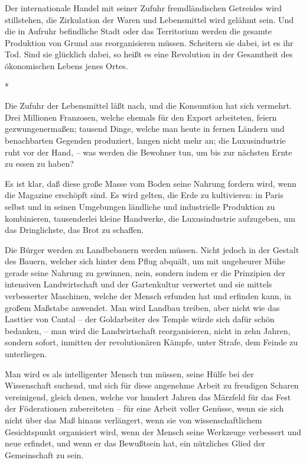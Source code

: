 \documentclass{scrbook}
\begin{document}
Der internationale Handel mit seiner Zufuhr fremdländischen Getreides wird stillstehen, die Zirkulation der Waren und Lebensmittel wird gelähmt sein. Und die in Aufruhr befindliche Stadt oder das Territorium werden die gesamte Produktion von Grund aus reorganisieren müssen. Scheitern sie dabei, ist es ihr Tod. Sind sie glücklich dabei, so heißt es eine Revolution in der Gesamtheit des ökonomischen Lebens jenes Ortes.

\begin{center}*\end{center}

Die Zufuhr der Lebensmittel läßt nach, und die Konsumtion hat sich vermehrt. Drei Millionen Franzosen, welche ehemals für den Export arbeiteten, feiern gezwungenermaßen; tausend Dinge, welche man heute in fernen Ländern und benachbarten Gegenden produziert, langen nicht mehr an; die Luxusindustrie ruht vor der Hand, – was werden die Bewohner tun, um bis zur nächsten Ernte zu essen zu haben?

Es ist klar, daß diese große Masse vom Boden seine Nahrung fordern wird, wenn die Magazine erschöpft sind. Es wird gelten, die Erde zu kultivieren: in Paris selbst und in seinen Umgebungen ländliche und industrielle Produktion zu kombinieren, tausenderlei kleine Handwerke, die Luxusindustrie aufzugeben, um das Dringlichste, das Brot zu schaffen.

Die Bürger werden zu Landbebauern werden müssen. Nicht jedoch in der Gestalt des Bauern, welcher sich hinter dem Pflug abquält, um mit ungeheurer Mühe gerade seine Nahrung zu gewinnen, nein, sondern indem er die Prinzipien der intensiven Landwirtschaft und der Gartenkultur verwertet und sie mittels verbesserter Maschinen, welche der Mensch erfunden hat und erfinden kann, in großem Maßstabe anwendet. Man wird Landbau treiben, aber nicht wie das Lasttier von Cantal – der Goldarbeiter des Temple würde sich dafür schön bedanken, – man wird die Landwirtschaft reorganisieren, nicht in zehn Jahren, sondern sofort, inmitten der revolutionären Kämpfe, unter Strafe, dem Feinde zu unterliegen.

Man wird es als intelligenter Mensch tun müssen, seine Hülfe bei der Wissenschaft suchend, und sich für diese angenehme Arbeit zu freudigen Scharen vereinigend, gleich denen, welche vor hundert Jahren das Märzfeld für das Fest der Föderationen zubereiteten – für eine Arbeit voller Genüsse, wenn sie sich nicht über das Maß hinaus verlängert, wenn sie von wissenschaftlichem Gesichtspunkt organisiert wird, wenn der Mensch seine Werkzeuge verbessert und neue erfindet, und wenn er das Bewußtsein hat, ein nützliches Glied der Gemeinschaft zu sein.
\end{document}
